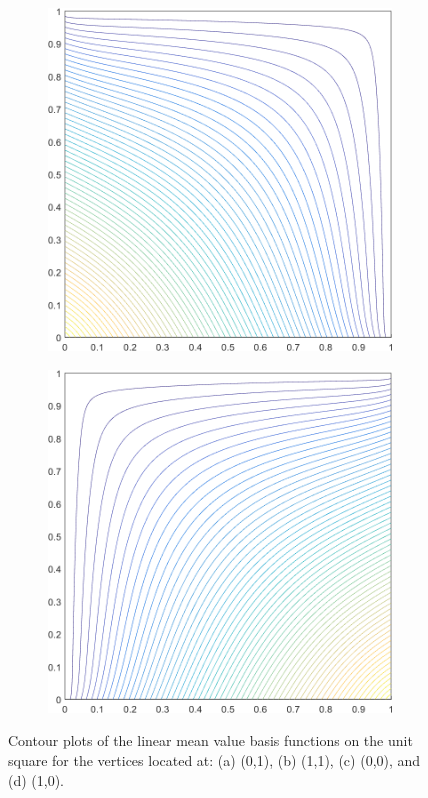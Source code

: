 \begin{figure}
\begin{subfigure}[b]{0.39\textwidth}
		\caption{}
	\end{subfigure}
	\vfill
	\begin{subfigure}[b]{0.39\textwidth}
		\centering
		\includegraphics[width=\textwidth]{figures/sec_BF/square_MV1_contour_b1.png}
		\caption{}
	\end{subfigure}
	\hspace{1.5cm}
	\begin{subfigure}[b]{0.39\textwidth}
		\centering
		\includegraphics[width=\textwidth]{figures/sec_BF/square_MV1_contour_b2.png}
		\caption{}
	\end{subfigure}
\caption{Contour plots of the linear mean value basis functions on the unit square for the vertices located at: (a) (0,1), (b) (1,1), (c) (0,0), and (d) (1,0).}
\label{fig::2D_MV1_unit_square_basis_functions}
\end{figure}

